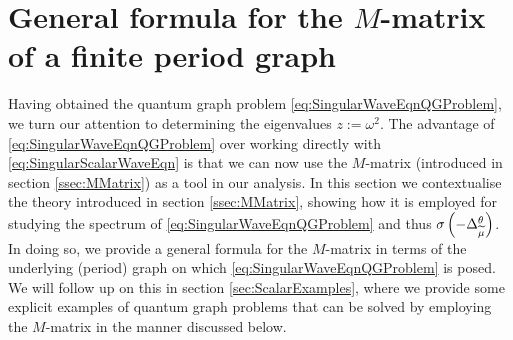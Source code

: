 \section{General formula for the $M$-matrix of a finite period graph} \label{sec:ScalarDiscussion}
Having obtained the quantum graph problem \eqref{eq:SingularWaveEqnQGProblem}, we turn our attention to determining the eigenvalues $z := \omega^2$.
The advantage of \eqref{eq:SingularWaveEqnQGProblem} over working directly with \eqref{eq:SingularScalarWaveEqn} is that we can now use the $M$-matrix (introduced in section \ref{ssec:MMatrix}) as a tool in our analysis.
In this section we contextualise the theory introduced in section \ref{ssec:MMatrix}, showing how it is employed for studying the spectrum of \eqref{eq:SingularWaveEqnQGProblem} and thus $\sigma\left( -\Delta_{\widetilde{\mu}}^{\theta} \right)$.
In doing so, we provide a general formula for the $M$-matrix in terms of the underlying (period) graph on which \eqref{eq:SingularWaveEqnQGProblem} is posed.
We will follow up on this in section \ref{sec:ScalarExamples}, where we provide some explicit examples of quantum graph problems that can be solved by employing the $M$-matrix in the manner discussed below.

